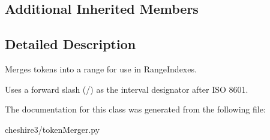 \subsection*{Additional Inherited Members}


\subsection{Detailed Description}
\begin{DoxyVerb}Merges tokens into a range for use in RangeIndexes.

Uses a forward slash (/) as the interval designator after ISO 8601.
\end{DoxyVerb}
 

The documentation for this class was generated from the following file\-:\begin{DoxyCompactItemize}
\item 
cheshire3/token\-Merger.\-py\end{DoxyCompactItemize}

